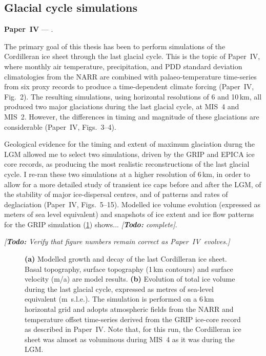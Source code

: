 \documentclass{article}
\newcommand{\todo}[1]{\emph{[\textbf{Todo:} #1]}}
\newcommand{\CCYC}[0]{Paper~IV}     %
\begin{document}
\subsection{Glacial cycle simulations}

\noindent\textbf{\CCYC} --- .
\bigskip

The primary goal of this thesis has been to perform simulations of the
Cordilleran ice sheet through the last glacial cycle. This is the topic of
\CCYC, where monthly air temperature, precipitation, and PDD standard deviation
climatologies from the NARR are combined with palaeo-temperature time-series
from six proxy records to produce a time-dependent climate forcing (\CCYC,
Fig.~2). The resulting simulations, using horizontal resolutions of 6 and
10\,km, all produced two major glaciations during the last glacial cycle, at
MIS~4 and MIS~2. However, the differences in timing and magnitude of these
glaciations are considerable (\CCYC, Figs.~3--4).

Geological evidence for the timing and extent of maximum glaciation durng the
LGM allowed me to select two simulations, driven by the GRIP
\citep{Dansgaard.etal.1993} and EPICA \citep{Jouzel.etal.2007} ice core
records, as producing the most realistic reconstructions of the last glacial
cycle. I re-ran these two simulations at a higher resolution of 6\,km, in order
to allow for a more detailed study of transient ice caps before and after the
LGM, of the stability of major ice-dispersal centres, and of patterns and rates
of deglaciation (\CCYC, Figs.~5--15). Modelled ice volume evolution (expressed
as meters of sea level equivalent) and snapshots of ice extent and ice flow
patterns for the GRIP simulation (\cref{fig:plot-snapshots}) shows...
\todo{complete}.

\todo{Verify that figure numbers remain correct as \CCYC\ evolves.}

\begin{figure}
  \centering
  \caption{\textbf{(a)} Modelled growth and decay of the last Cordilleran ice
           sheet. Basal topography, surface topography (1\,km contours) and
           surface velocity (m/a) are model results.
           \textbf{(b)} Evolution of total ice volume during the last glacial
           cycle, expressed as metres of sea-level equivalent (m~s.l.e.). The
           simulation is performed on a 6\,km horizontal grid and adopts
           atmospheric fields from the NARR \citep{Mesinger.etal.2006} and
           temperature offset time-series derived from the GRIP ice-core record
           \citep{Dansgaard.etal.1993} as described in \CCYC. Note that, for
           this run, the Cordilleran ice sheet was almost as voluminous during
           MIS~4 as it was during the LGM.}
  \label{fig:plot-snapshots}
\end{figure}
\end{document}
